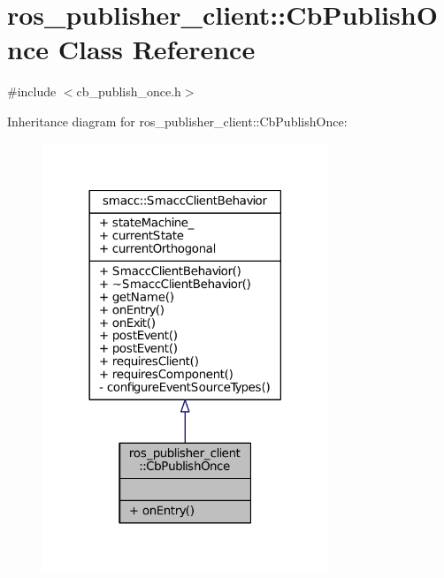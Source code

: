 \hypertarget{classros__publisher__client_1_1CbPublishOnce}{}\section{ros\+\_\+publisher\+\_\+client\+:\+:Cb\+Publish\+Once Class Reference}
\label{classros__publisher__client_1_1CbPublishOnce}


{\ttfamily \#include $<$cb\+\_\+publish\+\_\+once.\+h$>$}



Inheritance diagram for ros\+\_\+publisher\+\_\+client\+:\+:Cb\+Publish\+Once\+:
\nopagebreak
\begin{figure}[H]
\begin{center}
\leavevmode
\includegraphics[width=242pt]{classros__publisher__client_1_1CbPublishOnce__inherit__graph}
\end{center}
\end{figure}


